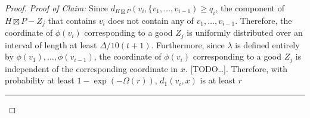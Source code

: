 \documentclass{patmorin}
\renewenvironment{clmproof}{\noindent\emph{Proof of Claim:}}{\hfill\rule{1ex}{1ex}}
\begin{document}
\begin{proof}
\begin{clmproof}
    Since $d_{H\boxtimes P}(v_i,\{v_1,\ldots,v_{i-1})\ge q_i$, the component of $H\boxtimes P-Z_j$ that contains $v_i$ does not contain any of $v_1,\ldots,v_{i-1}$.  Therefore, the coordinate of $\phi(v_i)$ corresponding to a good $Z_j$ is uniformly distributed over an interval of length at least $\Delta/10(t+1)$.  Furthermore, since $\lambda$ is defined entirely by $\phi(v_1),\ldots,\phi(v_{i-1})$, the coordinate of $\phi(v_i)$ corresponding to a good $Z_j$ is independent of the corresponding coordinate in $x$. [TODO\ldots]. Therefore, with probability at least $1-\exp(-\Omega(r))$, $d_1(v_i,x)$ is at least $r$
  \end{clmproof}

\end{proof}
\end{document}
